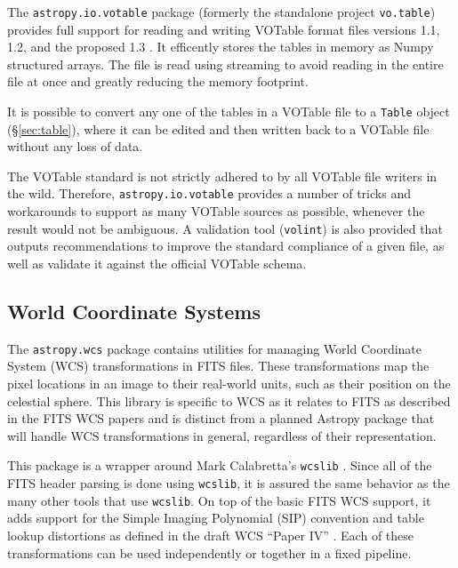 \documentclass[traditabstract]{aa}
\begin{document}
\label{sec:votable}

The \texttt{astropy.io.votable} package (formerly the standalone project
\texttt{vo.table}) provides full support for reading and writing VOTable
format files versions 1.1, 1.2, and the proposed 1.3
\citep{ochsenbein2004votable,ochsenbein2009votable}. It efficently stores the
tables in memory as Numpy structured arrays. The file is read using streaming
to avoid reading in the entire file at once and greatly reducing the memory
footprint.

It is possible to convert any one of the tables in a VOTable file to a
\texttt{Table} object (\S\ref{sec:table}), where it can be edited and then
written back to a VOTable file without any loss of data.

The VOTable standard is not strictly adhered to by all VOTable file writers in
the wild. Therefore, \texttt{astropy.io.votable} provides a number of tricks
and workarounds to support as many VOTable sources as possible, whenever the
result would not be ambiguous. A validation tool (\texttt{volint}) is also
provided that outputs recommendations to improve the standard compliance of a
given file, as well as validate it against the official VOTable schema.

\subsection{World Coordinate Systems}

\label{sec:wcs}


The \texttt{astropy.wcs} package contains utilities for managing World
Coordinate System (WCS) transformations in FITS files. These transformations
map the pixel locations in an image to their real-world units, such as their
position on the celestial sphere. This library is specific to WCS as it
relates to FITS as described in the FITS WCS papers
\citep{greisen2002wcs,calabretta2002wcs,greisen2006wcs} and is distinct from a
planned Astropy package that will handle WCS transformations in general,
regardless of their representation.

This package is a wrapper around Mark Calabretta's \texttt{wcslib}
\citep{calabretta2013wcslib}. Since all of the FITS header parsing is done
using \texttt{wcslib}, it is assured the same behavior as the many other tools
that use \texttt{wcslib}. On top of the basic FITS WCS support, it adds
support for the Simple Imaging Polynomial (SIP) convention and table lookup
distortions as defined in the draft WCS ``Paper IV''
\citep{calabretta2004wcs}. Each of these transformations can be used
independently or together in a fixed pipeline.
\end{document}
